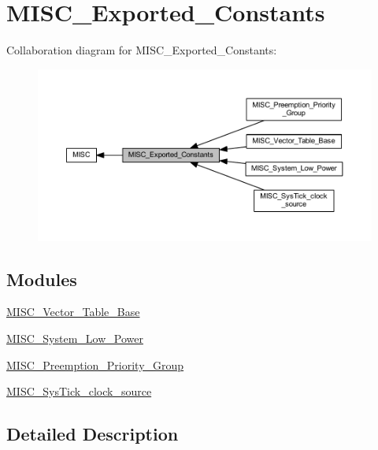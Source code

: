 \hypertarget{group___m_i_s_c___exported___constants}{}\section{M\+I\+S\+C\+\_\+\+Exported\+\_\+\+Constants}
\label{group___m_i_s_c___exported___constants}
Collaboration diagram for M\+I\+S\+C\+\_\+\+Exported\+\_\+\+Constants\+:
\nopagebreak
\begin{figure}[H]
\begin{center}
\leavevmode
\includegraphics[width=350pt]{group___m_i_s_c___exported___constants}
\end{center}
\end{figure}
\subsection*{Modules}
\begin{DoxyCompactItemize}
\item 
\hyperlink{group___m_i_s_c___vector___table___base}{M\+I\+S\+C\+\_\+\+Vector\+\_\+\+Table\+\_\+\+Base}
\item 
\hyperlink{group___m_i_s_c___system___low___power}{M\+I\+S\+C\+\_\+\+System\+\_\+\+Low\+\_\+\+Power}
\item 
\hyperlink{group___m_i_s_c___preemption___priority___group}{M\+I\+S\+C\+\_\+\+Preemption\+\_\+\+Priority\+\_\+\+Group}
\item 
\hyperlink{group___m_i_s_c___sys_tick__clock__source}{M\+I\+S\+C\+\_\+\+Sys\+Tick\+\_\+clock\+\_\+source}
\end{DoxyCompactItemize}


\subsection{Detailed Description}
